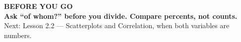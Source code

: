 \documentclass[aspectratio=169, 11pt]{beamer}
\begin{document}
{
\begin{frame}[plain]
  \vspace{1.5cm}\hspace{0.8cm}%
  \begin{minipage}{0.86\textwidth}
    {\color{goldacc}\bfseries\small BEFORE YOU GO}\\[0.7cm]
    {\color{white}\bfseries\Large Ask ``of whom?'' before you divide. Compare percents, not
    counts.}\\[0.9cm]
    {\color{skymid}\small Next: Lesson 2.2 --- Scatterplots and Correlation, when both
    variables are numbers.}
  \end{minipage}
\end{frame}
}
\end{document}

